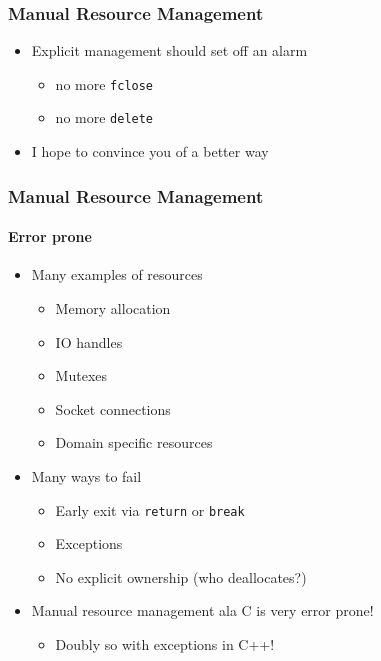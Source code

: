 \begin{frame}[fragile]
    \frametitle{Manual Resource Management}
    \begin{itemize}
        \item Explicit management should set off an alarm
            \begin{itemize}
                \item no more \texttt{fclose}
                \item no more \texttt{delete}
            \end{itemize}
        \item I hope to convince you of a better way
    \end{itemize}
\end{frame}

\begin{frame}
    \frametitle{Manual Resource Management}
    \framesubtitle{Error prone}
    \begin{itemize}
        \item Many examples of resources
            \begin{itemize}
                \item Memory allocation
                \item IO handles
                \item Mutexes
                \item Socket connections
                \item Domain specific resources
            \end{itemize}
        \item Many ways to fail
            \begin{itemize}
                \item Early exit via \texttt{return} or \texttt{break}
                \item Exceptions
                \item No explicit ownership (who deallocates?)
            \end{itemize}
        \item Manual resource management ala C is very error prone!
            \begin{itemize}
                \item Doubly so with exceptions in C++!
            \end{itemize}
    \end{itemize}
\end{frame}

